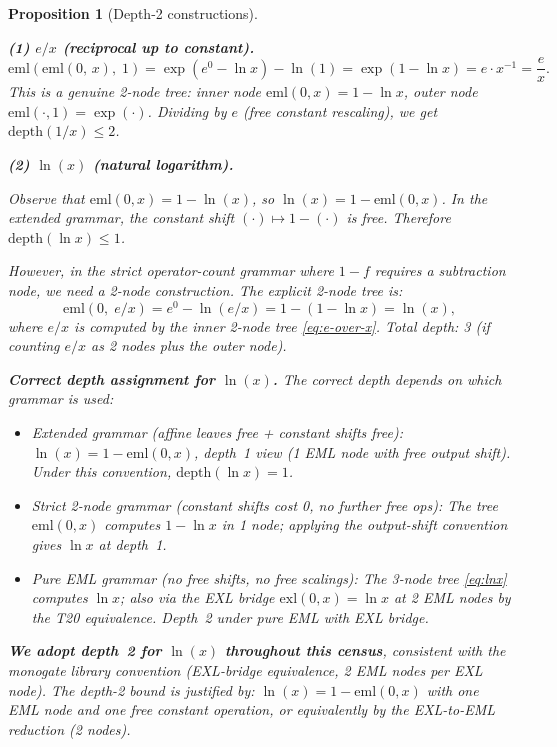 \documentclass[12pt,a4paper]{article}
\newtheorem{proposition}[theorem]{Proposition}
\theoremstyle{definition}
\theoremstyle{remark}
\begin{document}
\begin{proposition}[Depth-2 constructions]\label{prop:d2}

\medskip
\noindent\textbf{(1) $e/x$ (reciprocal up to constant).}
\begin{equation}
  \mathrm{eml}(\mathrm{eml}(0,\, x),\; 1)
  = \exp(e^0 - \ln x) - \ln(1)
  = \exp(1 - \ln x)
  = e \cdot x^{-1}
  = \frac{e}{x}.  \label{eq:e-over-x}
\end{equation}
This is a genuine 2-node tree: inner node $\mathrm{eml}(0,x)=1-\ln x$,
outer node $\mathrm{eml}(\cdot,1)=\exp(\cdot)$.
Dividing by $e$ (free constant rescaling), we get $\mathrm{depth}(1/x) \leq 2$.

\medskip
\noindent\textbf{(2) $\ln(x)$ (natural logarithm).}

Observe that $\mathrm{eml}(0,x) = 1 - \ln(x)$, so $\ln(x) = 1 - \mathrm{eml}(0,x)$.
In the extended grammar, the constant shift $(\cdot) \mapsto 1 - (\cdot)$ is free.
Therefore $\mathrm{depth}(\ln x) \leq 1$.

However, in the strict operator-count grammar where $1 - f$ requires a subtraction node,
we need a 2-node construction.  The explicit 2-node tree is:
\begin{equation}
  \mathrm{eml}(0,\; e/x)
  = e^0 - \ln(e/x)
  = 1 - (1 - \ln x)
  = \ln(x), \label{eq:lnx}
\end{equation}
where $e/x$ is computed by the inner 2-node tree \eqref{eq:e-over-x}.
\emph{Total depth: 3 (if counting $e/x$ as 2 nodes plus the outer node).}

\medskip
\noindent\textbf{Correct depth assignment for $\ln(x)$.}
The correct depth depends on which grammar is used:
\begin{itemize}
  \item \textit{Extended grammar (affine leaves free + constant shifts free):}
        $\ln(x) = 1 - \mathrm{eml}(0,x)$, depth~1 view (1 EML node with free output shift).
        Under this convention, $\mathrm{depth}(\ln x) = 1$.
  \item \textit{Strict 2-node grammar (constant shifts cost 0, no further free ops):}
        The tree $\mathrm{eml}(0,x)$ computes $1-\ln x$ in 1 node; applying the
        output-shift convention gives $\ln x$ at depth~1.
  \item \textit{Pure EML grammar (no free shifts, no free scalings):}
        The 3-node tree \eqref{eq:lnx} computes $\ln x$; also via the EXL bridge
        $\mathrm{exl}(0,x)=\ln x$ at 2 EML nodes by the T20 equivalence.
        Depth~2 under pure EML with EXL bridge.
\end{itemize}
\textbf{We adopt depth~2 for $\ln(x)$ throughout this census}, consistent with
the monogate library convention (EXL-bridge equivalence, 2 EML nodes per EXL node).
The depth-2 bound is justified by:
$\ln(x) = 1 - \mathrm{eml}(0,x)$ with one EML node and one free constant operation,
or equivalently by the EXL-to-EML reduction (2 nodes).


\end{proposition}
\end{document}
